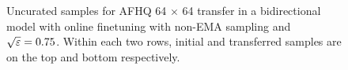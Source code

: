 \documentclass{article}
\begin{document}
\begin{figure}[htbp]
    \hfill
    \caption{Uncurated samples for AFHQ 64 $\times$ 64 transfer in a bidirectional model with online finetuning with non-EMA sampling and $\sqrt{\varepsilon}=0.75$. Within each two rows, initial and transferred samples are on the top and bottom respectively.} 
    \label{fig:afhq64_bidirectional_online_non_ema} 
\end{figure}
\end{document}
